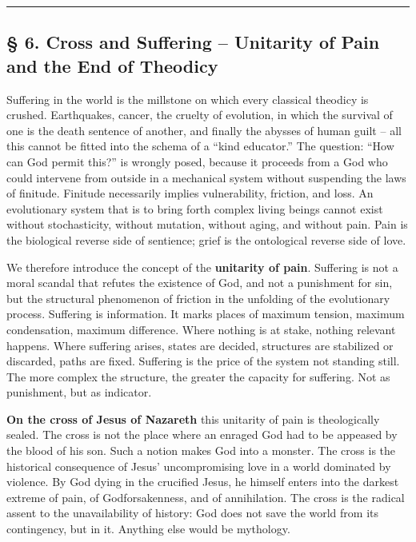 \documentclass[
  english,
]{article}
\begin{document}
\begin{center}\rule{0.5\linewidth}{0.5pt}\end{center}

\subsection{§ 6. Cross and Suffering -- Unitarity of Pain and the End of
Theodicy}\label{cross-and-suffering-unitarity-of-pain-and-the-end-of-theodicy}

Suffering in the world is the millstone on which every classical
theodicy is crushed. Earthquakes, cancer, the cruelty of evolution, in
which the survival of one is the death sentence of another, and finally
the abysses of human guilt -- all this cannot be fitted into the schema
of a ``kind educator.'' The question: ``How can God permit this?'' is
wrongly posed, because it proceeds from a God who could intervene from
outside in a mechanical system without suspending the laws of finitude.
Finitude necessarily implies vulnerability, friction, and loss. An
evolutionary system that is to bring forth complex living beings cannot
exist without stochasticity, without mutation, without aging, and
without pain. Pain is the biological reverse side of sentience; grief is
the ontological reverse side of love.

We therefore introduce the concept of the \textbf{unitarity of pain}.
Suffering is not a moral scandal that refutes the existence of God, and
not a punishment for sin, but the structural phenomenon of friction in
the unfolding of the evolutionary process. Suffering is information. It
marks places of maximum tension, maximum condensation, maximum
difference. Where nothing is at stake, nothing relevant happens. Where
suffering arises, states are decided, structures are stabilized or
discarded, paths are fixed. Suffering is the price of the system not
standing still. The more complex the structure, the greater the capacity
for suffering. Not as punishment, but as indicator.

\textbf{On the cross of Jesus of Nazareth} this unitarity of pain is
theologically sealed. The cross is not the place where an enraged God
had to be appeased by the blood of his son. Such a notion makes God into
a monster. The cross is the historical consequence of Jesus'
uncompromising love in a world dominated by violence. By God dying in
the crucified Jesus, he himself enters into the darkest extreme of pain,
of Godforsakenness, and of annihilation. The cross is the radical assent
to the unavailability of history: God does not save the world from its
contingency, but in it. Anything else would be mythology.
\end{document}
